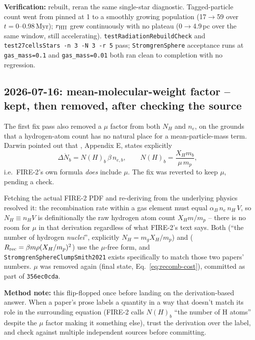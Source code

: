\textbf{Verification:} rebuilt, reran the same single-star diagnostic.
Tagged-particle count went from pinned at 1 to a smoothly growing
population (17$\to$59 over $t=0$--0.98\,Myr); $r_{\rm HII}$ grew
continuously with no plateau (0$\to$4.9\,pc over the same window,
still accelerating). \texttt{testRadiationRebuildCheck} and
\texttt{test27cellsStars -n 3 -N 3 -r 5} pass;
\texttt{StromgrenSphere} acceptance runs at \texttt{gas\_mass=0.1} and
\texttt{gas\_mass=0.01} both ran clean to completion with no
regression.

\subsection{2026-07-16: mean-molecular-weight factor -- kept, then removed, after checking the source}
\label{sec:mu-bug}

The first fix pass also removed a $\mu$ factor from both $N_H$ and
$n_e$, on the grounds that a hydrogen-atom count has no natural place
for a mean-particle-mass term. Darwin pointed out that
\citet{Hopkins2018}, Appendix E, states explicitly
\[
  \Delta\dot N_b = N(H)_b\,\beta\,n_{e,b}, \qquad
  N(H)_b = \frac{X_H m_b}{\mu\, m_p},
\]
i.e.\ FIRE-2's own formula \emph{does} include $\mu$. The fix was
reverted to keep $\mu$, pending a check.

Fetching the actual FIRE-2 PDF and re-deriving from the underlying
physics resolved it: the recombination rate within a gas element must
equal $\alpha_B\, n_e\, n_H\, V$, so $N_H \equiv n_H V$ is definitionally
the raw hydrogen atom count $X_H m/m_p$ -- there is no room for $\mu$
in that derivation regardless of what FIRE-2's text says. Both
\citet{Hu2017} (``the number of hydrogen \emph{nuclei}'', explicitly
$N_H = m_g X_H/m_p$) and \citet{Smith2021}
($R_{\rm rec}=\beta m\rho(X_H/m_p)^2$) use the $\mu$-free form, and
\texttt{StromgrenSphereClumpSmith2021} exists specifically to match
those two papers' numbers. $\mu$ was removed again (final state,
Eq.~\ref{eq:recomb-cost}), committed as part of \texttt{356ec0cda}.

\textbf{Method note:} this flip-flopped once before landing on the
derivation-based answer. When a paper's prose labels a quantity in a
way that doesn't match its role in the surrounding equation (FIRE-2
calls $N(H)_b$ ``the number of H atoms'' despite the $\mu$ factor
making it something else), trust the derivation over the label, and
check against multiple independent sources before committing.
